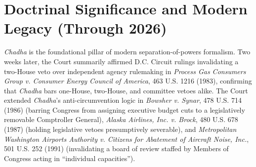 \documentclass[12pt]{article}
\begin{document}
\section{Doctrinal Significance and Modern Legacy (Through 2026)}
\textit{Chadha} is the foundational pillar of modern separation-of-powers formalism. Two weeks later, the Court summarily affirmed D.C. Circuit rulings invalidating a two-House veto over independent agency rulemaking in \textit{Process Gas Consumers Group v. Consumer Energy Council of America}, 463 U.S. 1216 (1983), confirming that \textit{Chadha} bars one-House, two-House, and committee vetoes alike. The Court extended \textit{Chadha}'s anti-circumvention logic in \textit{Bowsher v. Synar}, 478 U.S. 714 (1986) (barring Congress from assigning executive budget cuts to a legislatively removable Comptroller General), \textit{Alaska Airlines, Inc. v. Brock}, 480 U.S. 678 (1987) (holding legislative vetoes presumptively severable), and \textit{Metropolitan Washington Airports Authority v. Citizens for Abatement of Aircraft Noise, Inc.}, 501 U.S. 252 (1991) (invalidating a board of review staffed by Members of Congress acting in ``individual capacities'').
\end{document}
